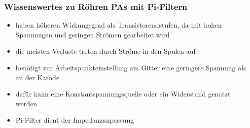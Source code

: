 \begin{frame}
  \frametitle{Wissenswertes zu Röhren PAs mit Pi-Filtern}
  \begin{center}
    \begin{itemize}
      \item haben höheren Wirkungsgrad als Transistorendstufen, da mit hohen Spannungen und geringen Strömen gearbeitet wird
      \item die meisten Verluste treten durch Ströme in den Spulen auf
      \item benötigt zur Arbeitspunkteinstellung am Gitter eine geringere Spannung als an der Katode
      \item dafür kann eine Konstantspannungsquelle oder ein Widerstand genutzt werden
      \item Pi-Filter dient der Impedanzanpassung
    \end{itemize}
  \end{center}
\end{frame}

